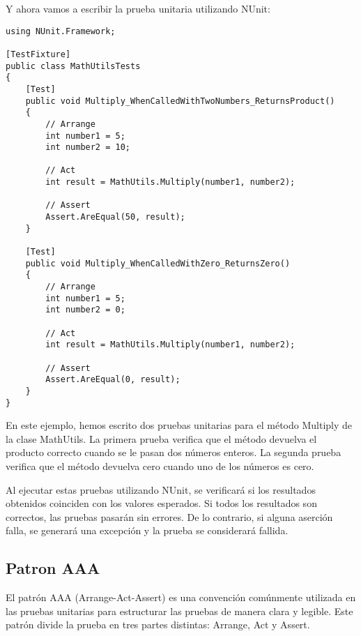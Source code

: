 \documentclass[executivepaper]{article}
\begin{document}
Y ahora vamos a escribir la prueba unitaria utilizando NUnit:
\begin{lstlisting}
using NUnit.Framework;

[TestFixture]
public class MathUtilsTests
{
    [Test]
    public void Multiply_WhenCalledWithTwoNumbers_ReturnsProduct()
    {
        // Arrange
        int number1 = 5;
        int number2 = 10;

        // Act
        int result = MathUtils.Multiply(number1, number2);

        // Assert
        Assert.AreEqual(50, result);
    }

    [Test]
    public void Multiply_WhenCalledWithZero_ReturnsZero()
    {
        // Arrange
        int number1 = 5;
        int number2 = 0;

        // Act
        int result = MathUtils.Multiply(number1, number2);

        // Assert
        Assert.AreEqual(0, result);
    }
}
\end{lstlisting}

En este ejemplo, hemos escrito dos pruebas unitarias para el método Multiply de la clase MathUtils. La primera prueba verifica que el método devuelva el producto correcto cuando se le pasan dos números enteros. La segunda prueba verifica que el método devuelva cero cuando uno de los números es cero.

Al ejecutar estas pruebas utilizando NUnit, se verificará si los resultados obtenidos coinciden con los valores esperados. Si todos los resultados son correctos, las pruebas pasarán sin errores. De lo contrario, si alguna aserción falla, se generará una excepción y la prueba se considerará fallida.

\subsection{Patron AAA}
El patrón AAA (Arrange-Act-Assert) es una convención comúnmente utilizada en las pruebas unitarias para estructurar las pruebas de manera clara y legible. Este patrón divide la prueba en tres partes distintas: Arrange, Act y Assert.
\end{document}
